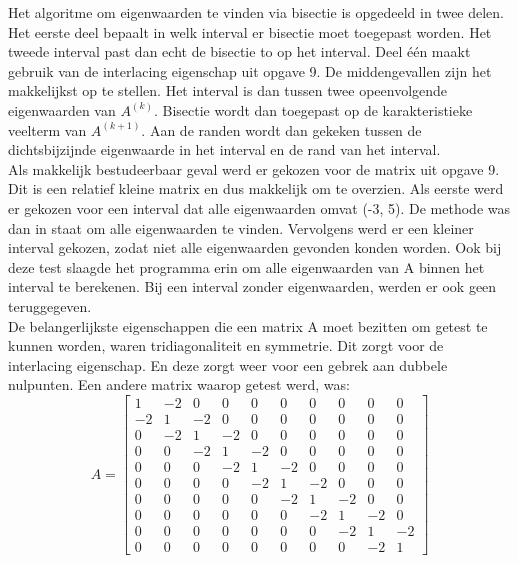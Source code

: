 Het algoritme om eigenwaarden te vinden via bisectie is opgedeeld in twee delen. Het eerste deel bepaalt in welk interval er bisectie moet toegepast worden. Het tweede interval past dan echt de bisectie to op het interval. Deel één maakt gebruik van de interlacing eigenschap uit opgave 9. De middengevallen zijn het makkelijkst op te stellen. Het interval is dan tussen twee opeenvolgende eigenwaarden van $A^{(k)}$. Bisectie wordt dan toegepast op de karakteristieke veelterm van $A^{(k+1)}$. Aan de randen wordt dan gekeken tussen de dichtsbijzijnde eigenwaarde in het interval en de rand van het interval.\\

Als makkelijk bestudeerbaar geval werd er gekozen voor de matrix uit opgave 9. Dit is een relatief kleine matrix en dus makkelijk om te overzien. Als eerste werd er gekozen voor een interval dat alle eigenwaarden omvat (-3, 5). De methode was dan in staat om alle eigenwaarden te vinden. Vervolgens werd er een kleiner interval gekozen, zodat niet alle eigenwaarden gevonden konden worden. Ook bij deze test slaagde het programma erin om alle eigenwaarden van A binnen het interval te berekenen. Bij een interval zonder eigenwaarden, werden er ook geen teruggegeven.\\

De belangerlijkste eigenschappen die een matrix A moet bezitten om getest te kunnen worden, waren tridiagonaliteit en symmetrie. Dit zorgt voor de interlacing eigenschap. En deze zorgt weer voor een gebrek aan dubbele nulpunten. Een andere matrix waarop getest werd, was:\\

\[
A = 
\begin{bmatrix}
1&	-2&	0	&0	&0	&0&	0	&0&	0&	0\\
-2	&1&	-2	&0&	0&	0&	0&	0&	0&	0\\
0	&-2&	1	&-2	&0	&0&	0&	0&	0&	0\\
0&	0&	-2	&1&	-2	&0&	0	&0	&0&	0\\
0&	0	&0&	-2	&1&	-2&	0&	0&	0&	0\\
0	&0&	0	&0	&-2	&1&-2&	0&	0&	0\\
0	&0&	0&	0&	0&	-2&	1	&-2	&0&	0\\
0	&0	&0&	0&	0&	0&	-2&	1&	-2&	0\\
0&	0	&0&	0&	0&	0&	0&	-2&	1	&-2\\
0&	0	&0&	0	&0	&0	&0	&0	&-2&	1
\end{bmatrix}
\]\\

